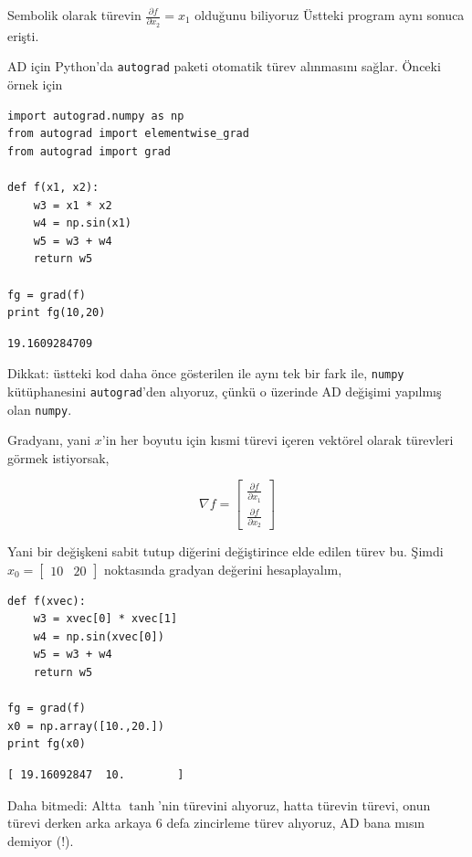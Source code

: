 \documentclass[12pt,fleqn]{article}\usepackage{../../common}
\begin{document}
Sembolik olarak türevin $\frac{\partial f}{\partial x_2} = x_1$ olduğunu biliyoruz Üstteki program aynı 
sonuca erişti. 

AD için Python'da \verb!autograd! paketi otomatik türev alınmasını
sağlar. Önceki örnek için

\begin{verbatim}
import autograd.numpy as np
from autograd import elementwise_grad
from autograd import grad

def f(x1, x2):
    w3 = x1 * x2
    w4 = np.sin(x1)
    w5 = w3 + w4
    return w5

fg = grad(f)
print fg(10,20)
\end{verbatim}

\begin{verbatim}
19.1609284709
\end{verbatim}

Dikkat: üstteki kod daha önce gösterilen ile aynı tek bir fark ile,
\verb!numpy! kütüphanesini \verb!autograd!'den alıyoruz, çünkü o üzerinde
AD değişimi yapılmış olan \verb!numpy!.

Gradyanı, yani $x$'in her boyutu için kısmi türevi içeren vektörel olarak
türevleri görmek istiyorsak, 

$$ \nabla f = \left[\begin{array}{r}
\frac{\partial f}{\partial x_1} \\
\frac{\partial f}{\partial x_2}
\end{array}\right]$$

Yani bir değişkeni sabit tutup diğerini değiştirince elde edilen türev
bu. Şimdi $x_0 = \left[\begin{array}{cc}10&20\end{array}\right]$ noktasında
gradyan değerini hesaplayalım,

\begin{verbatim}
def f(xvec):
    w3 = xvec[0] * xvec[1]
    w4 = np.sin(xvec[0])
    w5 = w3 + w4
    return w5

fg = grad(f)
x0 = np.array([10.,20.])
print fg(x0)
\end{verbatim}

\begin{verbatim}
[ 19.16092847  10.        ]
\end{verbatim}

Daha bitmedi: Altta $\tanh$'nin türevini alıyoruz, hatta türevin türevi,
onun türevi derken arka arkaya 6 defa zincirleme türev alıyoruz, AD bana
mısın demiyor (!).
\end{document}

